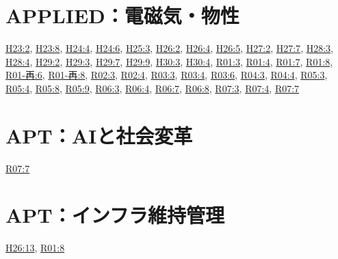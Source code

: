 \section{APPLIED：電磁気・物性}
\hyperref[q:h23-reg-applied-02]{H23:2}, \hyperref[q:h23-reg-applied-08]{H23:8}, \hyperref[q:h24-reg-applied-04]{H24:4}, \hyperref[q:h24-reg-applied-06]{H24:6}, \hyperref[q:h25-reg-applied-03]{H25:3}, \hyperref[q:h26-reg-applied-02]{H26:2}, \hyperref[q:h26-reg-applied-04]{H26:4}, \hyperref[q:h26-reg-applied-05]{H26:5}, \hyperref[q:h27-reg-applied-02]{H27:2}, \hyperref[q:h27-reg-applied-07]{H27:7}, \hyperref[q:h28-reg-applied-03]{H28:3}, \hyperref[q:h28-reg-applied-04]{H28:4}, \hyperref[q:h29-reg-applied-02]{H29:2}, \hyperref[q:h29-reg-applied-03]{H29:3}, \hyperref[q:h29-reg-applied-07]{H29:7}, \hyperref[q:h29-reg-applied-09]{H29:9}, \hyperref[q:h30-reg-applied-03]{H30:3}, \hyperref[q:h30-reg-applied-04]{H30:4}, \hyperref[q:r01-reg-applied-03]{R01:3}, \hyperref[q:r01-reg-applied-04]{R01:4}, \hyperref[q:r01-reg-applied-07]{R01:7}, \hyperref[q:r01-reg-applied-08]{R01:8}, \hyperref[q:r01-ret-applied-06]{R01-再:6}, \hyperref[q:r01-ret-applied-08]{R01-再:8}, \hyperref[q:r02-reg-applied-03]{R02:3}, \hyperref[q:r02-reg-applied-04]{R02:4}, \hyperref[q:r03-reg-applied-03]{R03:3}, \hyperref[q:r03-reg-applied-04]{R03:4}, \hyperref[q:r03-reg-applied-06]{R03:6}, \hyperref[q:r04-reg-applied-03]{R04:3}, \hyperref[q:r04-reg-applied-04]{R04:4}, \hyperref[q:r05-reg-applied-03]{R05:3}, \hyperref[q:r05-reg-applied-04]{R05:4}, \hyperref[q:r05-reg-applied-08]{R05:8}, \hyperref[q:r05-reg-applied-09]{R05:9}, \hyperref[q:r06-reg-applied-03]{R06:3}, \hyperref[q:r06-reg-applied-04]{R06:4}, \hyperref[q:r06-reg-applied-07]{R06:7}, \hyperref[q:r06-reg-applied-08]{R06:8}, \hyperref[q:r07-reg-applied-03]{R07:3}, \hyperref[q:r07-reg-applied-04]{R07:4}, \hyperref[q:r07-reg-applied-07]{R07:7}
\section{APT：AIと社会変革}
\hyperref[q:r07-reg-apt-07]{R07:7}
\section{APT：インフラ維持管理}
\hyperref[q:h26-reg-apt-13]{H26:13}, \hyperref[q:r01-reg-apt-08]{R01:8}
